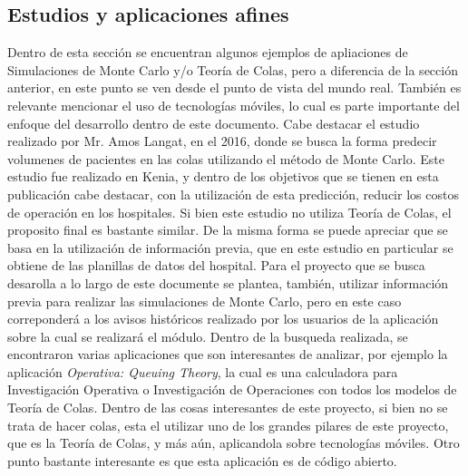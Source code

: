 \subsection{Estudios y aplicaciones afines} %
\noindent Dentro de esta sección se encuentran algunos ejemplos de apliaciones de Simulaciones de Monte Carlo y/o Teoría de Colas, pero a diferencia de la sección anterior, en este punto se ven desde el punto de vista del mundo real. También es relevante mencionar el uso de tecnologías móviles, lo cual es parte importante del enfoque del desarrollo dentro de este documento.
\newline \newline
\noindent Cabe destacar el estudio realizado por Mr. Amos Langat, en el 2016, donde se busca la forma predecir volumenes de pacientes en las colas utilizando el método de Monte Carlo. Este estudio fue realizado en Kenia, y dentro de los objetivos que se tienen en esta publicación cabe destacar, con la utilización de esta predicción, reducir los costos de operación en los hospitales. Si bien este estudio no utiliza Teoría de Colas, el proposito final es bastante similar. De la misma forma se puede apreciar que se basa en la utilización de información previa, que en este estudio en particular se obtiene de las planillas de datos del hospital. Para el proyecto que se busca desarolla a lo largo de este documente se plantea, también, utilizar información previa para realizar las simulaciones de Monte Carlo, pero en este caso correponderá a los avisos históricos realizado por los usuarios de la aplicación sobre la cual se realizará el módulo.
\newline \newline
Dentro de la busqueda realizada, se encontraron varias aplicaciones que son interesantes de analizar, por ejemplo la aplicación \textit{Operativa: Queuing Theory}, la cual es una calculadora para Investigación Operativa o Investigación de Operaciones con todos los modelos de Teoría de Colas. %
Dentro de las cosas interesantes de este proyecto, si bien no se trata de hacer colas, esta el utilizar uno de los grandes pilares de este proyecto, que es la Teoría de Colas, y más aún, aplicandola sobre tecnologías móviles. Otro punto bastante interesante es que esta aplicación es de código abierto. %
 \newline \newline
